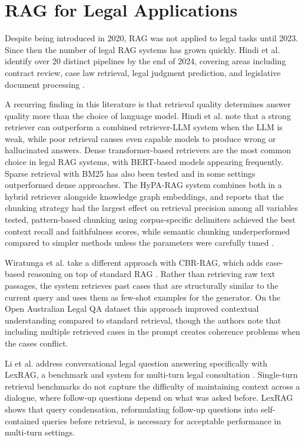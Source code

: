 \section{RAG for Legal Applications}
Despite being introduced in 2020, RAG was not applied to legal tasks until 2023. Since then the number of legal RAG systems has grown quickly. Hindi et al. identify over 20 distinct pipelines by the end of 2024, covering areas including contract review, case law retrieval, legal judgment prediction, and legislative document processing \cite{hindi2024ragsurvey}.

A recurring finding in this literature is that retrieval quality determines answer quality more than the choice of language model. Hindi et al. note that a strong retriever can outperform a combined retriever-LLM system when the LLM is weak, while poor retrieval causes even capable models to produce wrong or hallucinated answers. Dense transformer-based retrievers are the most common choice in legal RAG systems, with BERT-based models appearing frequently. Sparse retrieval with BM25 has also been tested and in some settings outperformed dense approaches. The HyPA-RAG system combines both in a hybrid retriever alongside knowledge graph embeddings, and reports that the chunking strategy had the largest effect on retrieval precision among all variables tested, pattern-based chunking using corpus-specific delimiters achieved the best context recall and faithfulness scores, while semantic chunking underperformed compared to simpler methods unless the parameters were carefully tuned \cite{hindi2024ragsurvey}.

Wiratunga et al. take a different approach with CBR-RAG, which adds case-based reasoning on top of standard RAG \cite{wiratunga2024cbrrag}. Rather than retrieving raw text passages, the system retrieves past cases that are structurally similar to the current query and uses them as few-shot examples for the generator. On the Open Australian Legal QA dataset this approach improved contextual understanding compared to standard retrieval, though the authors note that including multiple retrieved cases in the prompt creates coherence problems when the cases conflict.

Li et al. address conversational legal question answering specifically with LexRAG, a benchmark and system for multi-turn legal consultation \cite{li2024lexrag}. Single-turn retrieval benchmarks do not capture the difficulty of maintaining context across a dialogue, where follow-up questions depend on what was asked before. LexRAG shows that query condensation, reformulating follow-up questions into self-contained queries before retrieval, is necessary for acceptable performance in multi-turn settings.

